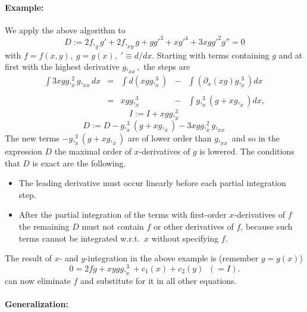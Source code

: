 \paragraph*{Example:}

We apply the above algorithm to
\begin{equation}
D := 2f,_yg' + 2f,_{xy}g + gg'^3 + xg'^4 + 3xgg'^2g'' = 0
\label{crack-D}
\end{equation}
with $f = f(x,y), \; g = g(x), \; '\equiv d/dx$.  Starting with terms
containing $g$ and at first with the highest derivative $g,_{xx},$ the
steps are
\[ \begin{array}{rcccl}
  \int 3xgg,_x^2g,_{xx} dx
  & = & \int d(xgg,_x^3)
  & - & \int \left( \partial_x(xg) g,_x^3\right) dx \\ \\
  & = & xgg,_x^3 & - & \int g,_x^3(g + xg,_x) dx,
\end{array} \]
\[ I := I + xgg,_x^3 \]
\[ D := D - g,_x^3(g + xg,_x) - 3xgg,_x^2g,_{xx} \]
The new terms $- g,_x^3(g + xg,_x)$ are of lower order than $g,_{xx}$
and so in the expression $D$ the maximal order of $x$-derivatives of
$g$ is lowered.  The conditions that $D$ is exact are the following.
\begin{itemize}
\item The leading derivative must occur linearly before each partial
  integration step.
\item After the partial integration of the terms with first-order
  $x$-derivatives of $f$ the remaining $D$ must not contain $f$ or
  other derivatives of $f$, because such terms cannot be integrated
  w.r.t.\ $x$ without specifying $f$.
\end{itemize}
The result of $x$- and $y$-integration in the above example is
(remember $g=g(x)$)
\[ 0 = 2fg + xygg,_x^3 + c_1(x) + c_2(y) \; \; (=I). \]
 can now eliminate $f$ and substitute
for it in all other equations.

\paragraph*{Generalization:}

